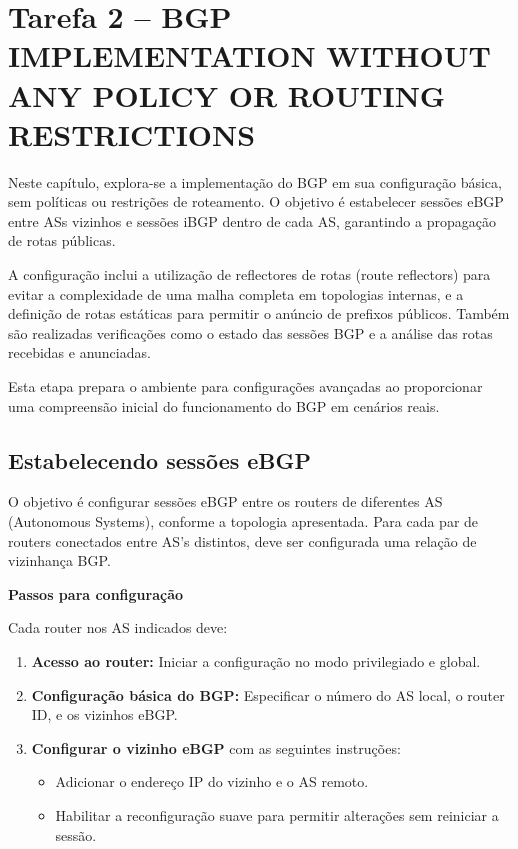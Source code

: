 \documentclass[11pt,english, openright, oneside]{book}
\begin{document}
\pagebreak
\section{Tarefa 2 -- BGP IMPLEMENTATION WITHOUT ANY POLICY OR ROUTING RESTRICTIONS}
\vspace{0.2cm}

Neste capítulo, explora-se a implementação do BGP em sua configuração básica, sem políticas ou restrições de roteamento. O objetivo é estabelecer sessões eBGP entre ASs vizinhos e sessões iBGP dentro de cada AS, garantindo a propagação de rotas públicas.

A configuração inclui a utilização de reflectores de rotas (route reflectors) para evitar a complexidade de uma malha completa em topologias internas, e a definição de rotas estáticas para permitir o anúncio de prefixos públicos. Também são realizadas verificações como o estado das sessões BGP e a análise das rotas recebidas e anunciadas.

Esta etapa prepara o ambiente para configurações avançadas ao proporcionar uma compreensão inicial do funcionamento do BGP em cenários reais.

\vspace{0.4cm}

\subsection{Estabelecendo sessões eBGP}
\vspace{0.2cm}

O objetivo é configurar sessões eBGP entre os routers de diferentes AS (Autonomous Systems), conforme a topologia apresentada. Para cada par de routers conectados entre AS's distintos, deve ser configurada uma relação de vizinhança BGP. \par

\vspace{0.6cm}
\textbf{Passos para configuração} \par
\vspace{0.2cm}
Cada router nos AS indicados deve:
\begin{enumerate}
  \item \textbf{Acesso ao router:} Iniciar a configuração no modo privilegiado e global.
  \item \textbf{Configuração básica do BGP:} Especificar o número do AS local, o router ID, e os vizinhos eBGP.
  \item \textbf{Configurar o vizinho eBGP} com as seguintes instruções:
  \begin{itemize}
    \item Adicionar o endereço IP do vizinho e o AS remoto.
    \item Habilitar a reconfiguração suave para permitir alterações sem reiniciar a sessão.
  \end{itemize}
\end{enumerate} \par
\end{document}
